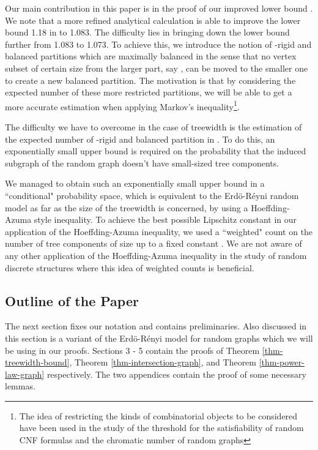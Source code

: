 \documentclass[11pt]{article}
\begin{document}
Our main contribution in this paper is in the proof of our improved lower bound  
. We note that a more refined analytical calculation is able to 
improve the lower bound 1.18 in \cite{kloks94} to 1.083. The difficulty lies in bringing 
down the lower bound further from 1.083 to 1.073.  To achieve this, we introduce the notion of
-rigid and balanced partitions  which are maximally balanced 
in the sense that no vertex subset of certain size from the larger part, say , can be moved 
to the smaller one  to create a new balanced partition. The motivation is that by considering the expected number of these more restricted partitions, 
we will be able to get a more accurate estimation when applying Markov's inequality\footnote{The idea of restricting the kinds of combinatorial objects to be considered have been used in the study of the threshold for the satisfiability of random CNF formulas and the chromatic number of random graphs\cite{kirousis94threshold,achlioptas99thesis,kirousis09threshold}}. 
 
The difficulty we have to overcome in the case of treewidth is the estimation of the expected 
number of -rigid and balanced partition  in . To do this, 
an exponentially small upper bound is required on the probability that the induced
subgraph  of the random graph  doesn't have small-sized tree components.

We managed to obtain such an exponentially small upper bound in a ``conditional" probability space, which is equivalent to the Erd\"{o}-R\'{e}yni random model as far as the size of the treewidth is concerned,  by  using a Hoeffding-Azuma style inequality.
To achieve the best possible  Lipschitz constant in our application of the Hoeffding-Azuma inequality, we used a ``weighted" count on the number of tree components of size up to a fixed constant .  We are not aware of any other application of the Hoeffding-Azuma inequality  
in the study of random discrete structures where this idea of weighted counts is beneficial.       



\subsection{Outline of the Paper}
The next section fixes our notation and contains preliminaries. Also discussed in this section
is a variant of the Erd\"{o}-R\'{e}nyi model for random graphs which we will be using in our proofs. Sections 3 - 5 contain the proofs of Theorem \ref{thm-treewidth-bound}, 
Theorem \ref{thm-intersection-graph}, and Theorem \ref{thm-power-law-graph} respectively. The two appendices contain the proof of some necessary lemmas.     
\end{document}
